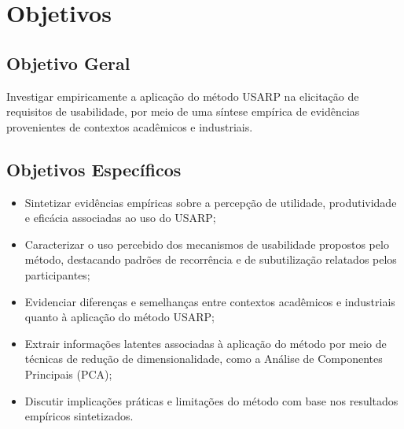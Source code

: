 \chapter{Objetivos}

\section{Objetivo Geral}

Investigar empiricamente a aplicação do método USARP na elicitação de requisitos de usabilidade, por meio de uma síntese empírica de evidências provenientes de contextos acadêmicos e industriais.

\section{Objetivos Específicos}

\begin{itemize}[leftmargin=1.5cm,label=\textbullet]
    \item Sintetizar evidências empíricas sobre a percepção de utilidade, produtividade e eficácia associadas ao uso do USARP;
    \item Caracterizar o uso percebido dos mecanismos de usabilidade propostos pelo método, destacando padrões de recorrência e de subutilização relatados pelos participantes;
    \item Evidenciar diferenças e semelhanças entre contextos acadêmicos e industriais quanto à aplicação do método USARP;
    \item Extrair informações latentes associadas à aplicação do método por meio de técnicas de redução de dimensionalidade, como a Análise de Componentes Principais (PCA);
    \item Discutir implicações práticas e limitações do método com base nos resultados empíricos sintetizados.
\end{itemize}







